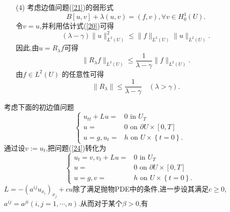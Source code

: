 \begin{enumerate}
    \item [(4)]考虑边值问题(\ref{21})的弱形式
      \[
	B[u,v]+\lambda (u,v)=(f,v), \forall v \in  H_0^{1}(U).
      \]  令$v=u$,并利用估计式(\ref{20})可得
       \[
	 \left( \lambda-\gamma \right) \|u\|^2_{L^2(U)}\le \|f\|_{L^2(U)}\|u\|_{L^2(U)}.
      \]
      因此,由$u=R_\lambda f$可得
      \[
	\|R_\lambda f\|_{L^2(U)}\le \frac{1}{\lambda-\gamma}\|f\|_{L^2(U)}.
      \]
      由$f\in L^2(U)$ 的任意性可得
      \begin{equation}
	\|R_\lambda\|\le \frac{1}{\lambda-\gamma}\quad \left( \lambda>\gamma \right) .
      \end{equation} 
  \end{enumerate}

  考虑下面的初边值问题
  \begin{equation}\label{24}
    \left\{
      \begin{aligned}
	u_{tt}+Lu=&0 \text{ in }U_{T}\\
	u=&0 \text{ on }\partial U\times [0,T]\\
	u=g,u_t=&h \text{ on } U\times \left\{t=0\right\} .
      \end{aligned}
      \right.
  \end{equation}
  通过设$v:=u_t$,把问题(\ref{24})转化为
   \begin{equation}
    \left\{
      \begin{aligned}
	u_t=v,v_t+Lu=&0 \text{ in }U_T\\
	u=&0 \text{ on }\partial U\times [0,T]\\
	u=g,v=&h \text{ on } U\times \left\{t=0\right\} .
      \end{aligned}
      \right.
  \end{equation}
  $L=-\left( a^{ij}u_{x_i} \right) _{x_j}+cu$除了满足抛物PDE中的条件,进一步设其满足$c\ge 0$,$a^{ij}=a^{ji} (i,j=1,\cdots,n)$.从而对于某个$\beta>0$,有

